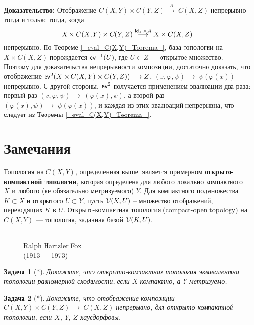 \documentclass[12pt]{book}
\newcommand{\arrow}{{\:\longrightarrow\:}}
\def\endproof{\hbox{\vrule width 5pt height 5pt depth 0pt}}
\renewcommand{\phi}{\varphi}
\def\Id{{\operatorname{\sf Id}}}
\newcommand{\ev}{\operatorname{\sf ev}}
\theoremstyle{upshape}
\newtheorem{zadacha}{Задача}[chapter]
\theoremstyle{generic}
\newtheorem{remark}[teorema]{Замечание}
\def\замечание{\begin{remark}}
\def\еза{\end{remark}}
\theoremstyle{upshapenonumber}
\newcommand{\следствие}{%
     \refstepcounter{teorema}
     {\noindent\bf Следствие \thechapter.\arabic{teorema}:\ }}
\newcommand{\пример}{%
     \refstepcounter{teorema}
     {\noindent\bf Пример \thechapter.\arabic{teorema}:\ }}
\newcommand{\лемма}{%
     \refstepcounter{teorema}
     {\noindent\bf Лемма \thechapter.\arabic{teorema}:\ }}
\newcommand{\теорема}{%
     \refstepcounter{teorema}
     {\noindent\bf Теорема \thechapter.\arabic{teorema}:\ }}
\newcommand{\утверждение}{%
     \refstepcounter{teorema}
     {\noindent\bf Утверждение \thechapter.\arabic{teorema}:\ }}
\def\хфилл{\hfill}
\def\ноиндент{\noindent}
\def\бф{\bf}
\def\ем{\em}
\def\задача{\begin{zadacha}}
\def\ез{\end{zadacha}}
\def\еу{\end{ukazanie}}
\def\ео{\end{opredelenie}}
\def\енум{\begin{enumerate}}
\def\ее{\end{enumerate}}
\begin{document}
\хфилл

\ноиндент
{\бф Доказательство:}
Отображение $C(X,Y) \times C(Y,Z)\stackrel A \arrow
C(X,Z)$ непрерывно тогда и только тогда, когда 
\[ X\times C(X,Y) \times C(Y,Z)\stackrel {\Id_X \times A} \arrow
X \times C(X,Z)
\]
непрерывно. По Теореме \ref{_eval_C(X,Y)_Teorema_},
база топологии на $X \times C(X,Z)$
порождается $\ev^{-1}(U)$, где $U\subset Z$ --- открытое
множество. Поэтому для доказательства непрерывности
композиции, достаточно доказать, что
отображение $\ev^2(X\times C(X,Y) \times C(Y,Z)) \arrow Z$,
$(x, \phi, \psi) \arrow \psi(\phi(x))$ непрерывно.
С другой стороны, $\ev^2$ получается применением
эвалюации два раза: первый раз
$(x, \phi, \psi) \arrow (\phi(x), \psi)$,
а второй раз --- $(\phi(x), \psi) \arrow \psi(\phi(x))$,
и каждая из этих эвалюаций непрерывна, что следует
из Теоремы \ref{_eval_C(X,Y)_Teorema_}. \endproof








\section{Замечания}


Топология на $C(X,Y)$, определенная выше, 
является примерном {\бф от\-кры\-то-компактной топологии},
которая определена для любого локально компактного $X$ 
и любого (не обязательно метризуемого) $Y$.
Для компактного подмножества $K \subset X$ и
открытого $U\subset Y$, пусть ${\cal V}(K, U)$ --
множество отображений, переводящих $K$ в $U$.
Открыто-компактная топология (compact-open topology)
на $C(X,Y)$ --- топология, заданная базой ${\cal V}(K, U)$.


\begin{figure}[ht]
\begin{center}
\\
{Ralph Hartzler Fox\\
(1913 --- 1973)}
\end{center}
\end{figure}


\задача[*]
Докажите, что открыто-компактная топология
эквивалентна топологии равномерной сходимости,
если $X$ компактно, а $Y$ метризуемо.
\ез

\задача[*]
Докажите, что отображение композиции
$C(X,Y) \times C(Y,Z) \arrow C(X,Z)$ непрерывно,
для открыто-компактной топологии, если $X$, $Y$, $Z$ 
хаусдорфовы.
\ез
\end{document}
